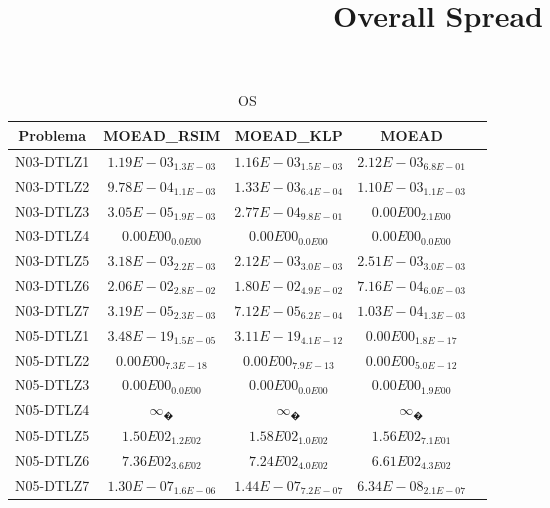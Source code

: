 \documentclass{article}
\title{Overall Spread}
\author{}
\begin{document}
\maketitle
\begin{table*}[ht!]
\scriptsize
\caption{OS}
\centering\begin{tabular}{|c||c||c||c||c|} \hline
Problema &MOEAD_RSIM &MOEAD_KLP &MOEAD\\\hline
N03-DTLZ1 &\cellcolor{gray25}$1.19E-03_{1.3E-03}$ &$1.16E-03_{1.5E-03}$ &\cellcolor{gray95}$2.12E-03_{6.8E-01}$\\ 
\hline
N03-DTLZ2 &$9.78E-04_{1.1E-03}$ &\cellcolor{gray95}$1.33E-03_{6.4E-04}$ &\cellcolor{gray25}$1.10E-03_{1.1E-03}$\\ 
\hline
N03-DTLZ3 &\cellcolor{gray25}$3.05E-05_{1.9E-03}$ &\cellcolor{gray95}$2.77E-04_{9.8E-01}$ &$0.00E00_{2.1E00}$\\ 
\hline
N03-DTLZ4 &\cellcolor{gray95}$0.00E00_{0.0E00}$ &\cellcolor{gray25}$0.00E00_{0.0E00}$ &$0.00E00_{0.0E00}$\\ 
\hline
N03-DTLZ5 &\cellcolor{gray95}$3.18E-03_{2.2E-03}$ &$2.12E-03_{3.0E-03}$ &\cellcolor{gray25}$2.51E-03_{3.0E-03}$\\ 
\hline
N03-DTLZ6 &\cellcolor{gray95}$2.06E-02_{2.8E-02}$ &\cellcolor{gray25}$1.80E-02_{4.9E-02}$ &$7.16E-04_{6.0E-03}$\\ 
\hline
N03-DTLZ7 &$3.19E-05_{2.3E-03}$ &\cellcolor{gray25}$7.12E-05_{6.2E-04}$ &\cellcolor{gray95}$1.03E-04_{1.3E-03}$\\ 
\hline
N05-DTLZ1 &\cellcolor{gray95}$3.48E-19_{1.5E-05}$ &\cellcolor{gray25}$3.11E-19_{4.1E-12}$ &$0.00E00_{1.8E-17}$\\ 
\hline
N05-DTLZ2 &\cellcolor{gray95}$0.00E00_{7.3E-18}$ &\cellcolor{gray25}$0.00E00_{7.9E-13}$ &$0.00E00_{5.0E-12}$\\ 
\hline
N05-DTLZ3 &\cellcolor{gray95}$0.00E00_{0.0E00}$ &\cellcolor{gray25}$0.00E00_{0.0E00}$ &$0.00E00_{1.9E00}$\\ 
\hline
N05-DTLZ4 &\cellcolor{gray95}$∞_{�}$ &\cellcolor{gray25}$∞_{�}$ &$∞_{�}$\\ 
\hline
N05-DTLZ5 &$1.50E02_{1.2E02}$ &\cellcolor{gray95}$1.58E02_{1.0E02}$ &\cellcolor{gray25}$1.56E02_{7.1E01}$\\ 
\hline
N05-DTLZ6 &\cellcolor{gray95}$7.36E02_{3.6E02}$ &\cellcolor{gray25}$7.24E02_{4.0E02}$ &$6.61E02_{4.3E02}$\\ 
\hline
N05-DTLZ7 &\cellcolor{gray25}$1.30E-07_{1.6E-06}$ &\cellcolor{gray95}$1.44E-07_{7.2E-07}$ &$6.34E-08_{2.1E-07}$\\ 

\end{tabular}
\end{table*}
\end{document}
